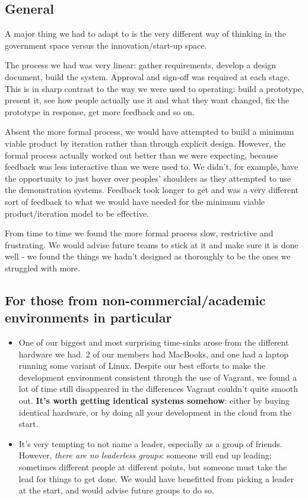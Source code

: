 \documentclass[12pt,a4paper,twosided]{article}
\begin{document}
\subsection{General}

A major thing we had to adapt to is the very different way of thinking
in the government space versus the innovation/start-up space.

The process we had was very linear: gather requirements, develop a
design document, build the system. Approval and sign-off was required at
each stage. This is in sharp contrast to the way we were used to
operating: build a prototype, present it, see how people actually use it
and what they want changed, fix the prototype in response, get more
feedback and so on.

Absent the more formal process, we would have attempted to build a
minimum viable product by iteration rather than through explicit design.
However, the formal process actually worked out better than we were
expecting, because feedback was less interactive than we were used to.
We didn't, for example, have the opportunity to just hover over peoples'
shoulders as they attempted to use the demonstration systems. Feedback
took longer to get and was a very different sort of feedback to what we
would have needed for the minimum viable product/iteration model to be
effective.

From time to time we found the more formal process slow, restrictive and
frustrating. We would advise future teams to stick at it and make sure
it is done well - we found the things we hadn't designed as thoroughly
to be the ones we struggled with more.

\subsection{For those from non-commercial/academic environments in
particular}

\begin{itemize}
\item
  One of our biggest and most surprising time-sinks arose from the
  different hardware we had. 2 of our members had MacBooks, and one had
  a laptop running some variant of Linux. Despite our best efforts to
  make the development environment consistent through the use of
  Vagrant, we found a lot of time still disappeared in the differences
  Vagrant couldn't quite smooth out. \textbf{It's worth getting
  identical systems somehow}: either by buying identical hardware, or by
  doing all your development in the cloud from the start.
\item
  It's very tempting to not name a leader, especially as a group of
  friends. However, \emph{there are no leaderless groups}: someone will
  end up leading; sometimes different people at different points, but
  someone must take the lead for things to get done. We would have
  benefitted from picking a leader at the start, and would advise future
  groups to do so.
\end{itemize}
\end{document}
